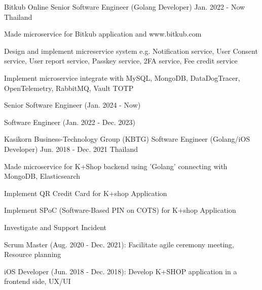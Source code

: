 

\begin{cventries}
  \cventry
  {Bitkub Online} %
  {Senior Software Engineer (Golang Developer)} %
  {Jan. 2022 - Now} %
  {Thailand} %
  {
    \begin{cvitems} %
      \item {Made microservice for Bitkub application and www.bitkub.com}
      \item {Design and implement micreservice system e.g. Notification service, User Consent service, User report service, Passkey service, 2FA service, Fee credit service}
      \item {Implement microservice integrate with MySQL, MongoDB, DataDogTracer, OpenTelemetry, RabbitMQ, Vault TOTP}  
      \item {Senior Software Engineer (Jan. 2024 - Now)}
      \item {Software Engineer (Jan. 2022 - Dec. 2023)}
    \end{cvitems}
  }

  \cventry
    {Kasikorn Business-Technology Group (KBTG)} %
    {Software Engineer (Golang/iOS Developer)} %
    {Jun. 2018 - Dec. 2021} %
    {Thailand} %
    {
      \begin{cvitems} %
        \item {Made microservice for K+Shop backend using 'Golang' connecting with MongoDB, Elasticsearch}
        \item {Implement QR Credit Card for K+shop Application}
        \item {Implement SPoC (Software-Based PIN on COTS) for K+shop Application}
        \item {Investigate and Support Incident}
        \item {Scrum Master (Aug. 2020 - Dec. 2021): Facilitate agile ceremony meeting, Resource planning}
        \item {iOS Developer (Jun. 2018 - Dec. 2018): Develop K+SHOP application in a frontend side, UX/UI}
      \end{cvitems}
    }


\end{cventries}
